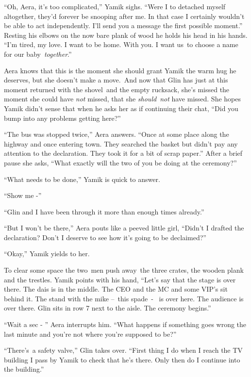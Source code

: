 \documentclass[twoside,11pt]{book}
\begin{document}
``Oh, Aera, it's too complicated,'' Yamik sighs. ``Were I to detached myself
altogether, they'd forever be snooping after me. In that case I certainly wouldn't be able to act independently. I'll
send you a message the first possible moment.'' Resting his elbows on the now bare plank of wood he holds
his head in his hands. ``I'm tired, my love. I want to be home. With you. I want
us{\ }to choose a name for our baby\ \textit{together}.'' 

Aera knows that this is the moment she should grant Yamik the warm hug he deserves, but she doesn't make a move.\ And
now that Glin has just at this moment returned with the shovel\ and the empty rucksack, she's missed the moment she
could have \textit{not} missed, that she \textit{should}\ \textit{not} have missed. She hopes Yamik didn't sense that
when he asks her as if continuing their chat, ``Did you bump into any problems getting
here?'' 

``The bus was stopped twice,'' Aera answers. ``Once at some place along the
highway and once entering town. They searched the basket but didn't pay any attention to the declaration. They took it
for a bit of scrap paper.'' After a brief pause she asks, ``What exactly will the two of you
be doing at the ceremony?'' 

``What needs to be done,'' Yamik is quick to answer. 

``Show me -'' 

``Glin and I have been through it more than enough times already.'' 

``But I won't be there,'' Aera pouts like a peeved little girl, ``Didn't I
drafted the declaration? Don't I deserve to see how it's going to be declaimed?'' 

``Okay,'' Yamik yields to her.\ 

To clear some space the two\  men push away\ the three crates, the wooden plank and the
trestles{.} Yamik points with his hand, ``Let's say that the stage
is over there. The dais is in the middle. The CEO and the MC and some VIP's sit behind it. The stand with the mike
--\ this spade\ {}- ~is over here. The audience is over there. Glin sits in row 7 next to the aisle. The ceremony
begins.'' 

``Wait a sec - '' Aera interrupts him. ``What happens if something goes wrong the
last minute and you're not where you're supposed to be?'' 

``There's~a safety valve,'' Glin takes over. ``First thing I do when I reach the
TV building I pass by Yamik to check that he's there. Only then do I continue into the building.'' 
\end{document}
